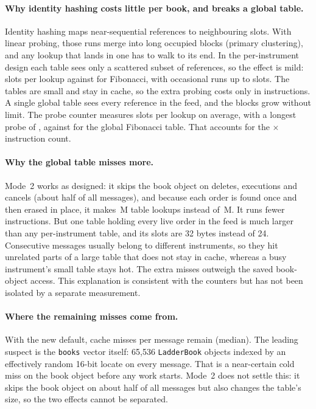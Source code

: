 \documentclass[10pt,a4paper]{article}
\newcommand{\code}[1]{\texttt{#1}}
\begin{document}
\paragraph{Why identity hashing costs little per book, and breaks a global table.} Identity hashing maps near-sequential references to neighbouring slots.
With linear probing, those runs merge into long occupied blocks (primary clustering), and any lookup that lands in one has to walk to its end.
In the per-instrument design each table sees only a scattered subset of references, so the effect is mild:
\DidAvg{} slots per lookup against \DfibAvg{} for Fibonacci, with occasional runs up to \DidMax{} slots.
The tables are small and stay in cache, so the extra probing costs only \PctHashInstr{} in instructions.
A single global table sees every reference in the feed, and the blocks grow without limit.
The probe counter measures \DgidAvg{} slots per lookup on average, with a longest probe of \DgidMax, against \DgfibAvg{} for the global Fibonacci table.
That accounts for the \GidInstrX$\times$ instruction count.

\paragraph{Why the global table misses more.} Mode~2 works as designed: it skips the book object on deletes, executions and cancels (about half of all messages),
and because each order is found once and then erased in place, it makes \LookupsGlobal\,M table lookups instead of \LookupsPerBook\,M.
It runs fewer instructions.
But one table holding every live order in the feed is much larger than any per-instrument table, and its slots are 32 bytes instead of 24.
Consecutive messages usually belong to different instruments, so they hit unrelated parts of a large table that does not stay in cache,
whereas a busy instrument's small table stays hot. The extra misses outweigh the saved book-object access.
This explanation is consistent with the counters but has not been isolated by a separate measurement.

\paragraph{Where the remaining misses come from.} With the new default, \CfibwP{} cache misses per message remain (median). The leading suspect is the
\code{books} vector itself: 65{,}536 \code{LadderBook} objects indexed by an effectively random 16-bit locate on every message.
That is a near-certain cold miss on the book object before any work starts. Mode~2 does not settle this: it skips the book object
on about half of all messages but also changes the table's size, so the two effects cannot be separated.
\end{document}
